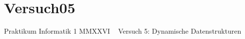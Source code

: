 \chapter{Versuch05 }
\hypertarget{index}{}\label{index}
Praktikum Informatik 1 MMXXVI ~\newline
 Versuch 5:\+ Dynamische Datenstrukturen 